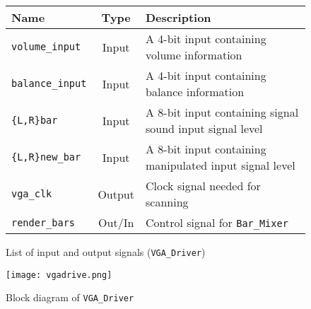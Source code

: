 \begin{figure}[H]
  \centering
  \caption{List of input and output signals (\texttt{VGA\_Driver})}
  \label{tab:vgaio}
    \begin{tabular}{|l|c|l|}
      \hline
      Name & Type & Description \\
      \hline
      \verb+volume_input+ & Input & A 4-bit input containing volume information\\
      \hline
      \verb+balance_input+ & Input & A 4-bit input containing balance information\\
      \hline
      \verb+{L,R}bar+ & Input & A 8-bit input containing signal sound input signal level\\
      \hline
      \verb+{L,R}new_bar+ & Input & A 8-bit input containing manipulated input signal level\\
      \hline
   	\verb+vga_clk+ & Output & Clock signal needed for scanning\\
      \hline
        \verb=render_bars= & Out/In & Control signal for \verb=Bar_Mixer=\\
      \hline
    \end{tabular}
\end{figure}
\begin{figure}[H]
        \centering
        \texttt{[image: vgadrive.png]} 
        \caption{Block diagram of \texttt{VGA\_Driver}}
        \label{fig:VGAdrive}
\end{figure}


 
